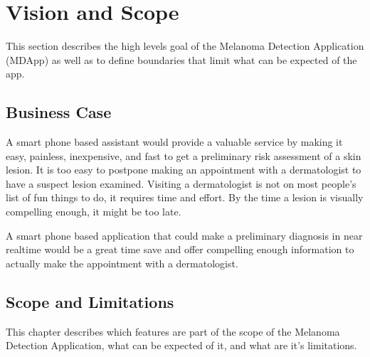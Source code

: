 \section{Vision and Scope}

    This section describes the high levels goal of the Melanoma Detection Application (MDApp) as well as to define boundaries that limit what can be expected of the app.

    \subsection{Business Case}

        A smart phone based assistant would provide a valuable service by making it easy, painless, inexpensive, and fast to get a preliminary risk assessment of a skin lesion. It is too easy to postpone making an appointment with a dermatologist to have a suspect lesion examined. Visiting a dermatologist is not on most people’s list of fun things to do, it requires time and effort. By the time a lesion is visually compelling enough, it might be too late.

A smart phone based application that could make a preliminary diagnosis in near realtime would be a great time save and offer compelling enough information to actually make the appointment with a dermatologist.

    \subsection{Scope and Limitations}

    This chapter describes which features are part of the scope of the Melanoma Detection Application, what can be expected of it, and what are it's limitations.

